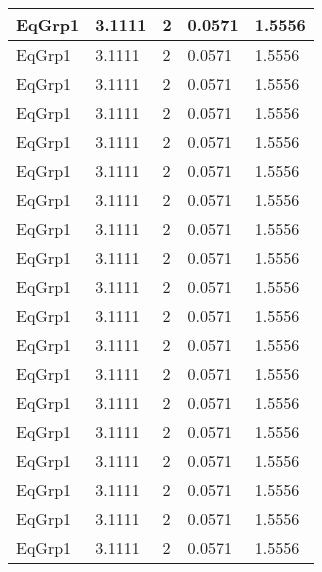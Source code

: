 \documentclass{article}
\begin{document}
\begin{longtable}[l]{|p{1.5cm} |p{3cm} |p{3cm} |p{3cm} |p{3cm} |}
            EqGrp1&3.1111&2&0.0571&1.5556\\\hline
        
            EqGrp1&3.1111&2&0.0571&1.5556\\\hline
        
            EqGrp1&3.1111&2&0.0571&1.5556\\\hline
        
            EqGrp1&3.1111&2&0.0571&1.5556\\\hline
        
            EqGrp1&3.1111&2&0.0571&1.5556\\\hline
        
            EqGrp1&3.1111&2&0.0571&1.5556\\\hline
        
            EqGrp1&3.1111&2&0.0571&1.5556\\\hline
        
            EqGrp1&3.1111&2&0.0571&1.5556\\\hline
        
            EqGrp1&3.1111&2&0.0571&1.5556\\\hline
        
            EqGrp1&3.1111&2&0.0571&1.5556\\\hline
        
            EqGrp1&3.1111&2&0.0571&1.5556\\\hline
        
            EqGrp1&3.1111&2&0.0571&1.5556\\\hline
        
            EqGrp1&3.1111&2&0.0571&1.5556\\\hline
        
            EqGrp1&3.1111&2&0.0571&1.5556\\\hline
        
            EqGrp1&3.1111&2&0.0571&1.5556\\\hline
        
            EqGrp1&3.1111&2&0.0571&1.5556\\\hline
        
            EqGrp1&3.1111&2&0.0571&1.5556\\\hline
        
            EqGrp1&3.1111&2&0.0571&1.5556\\\hline
        
            EqGrp1&3.1111&2&0.0571&1.5556\\\hline
        

\end{longtable}
\end{document}
